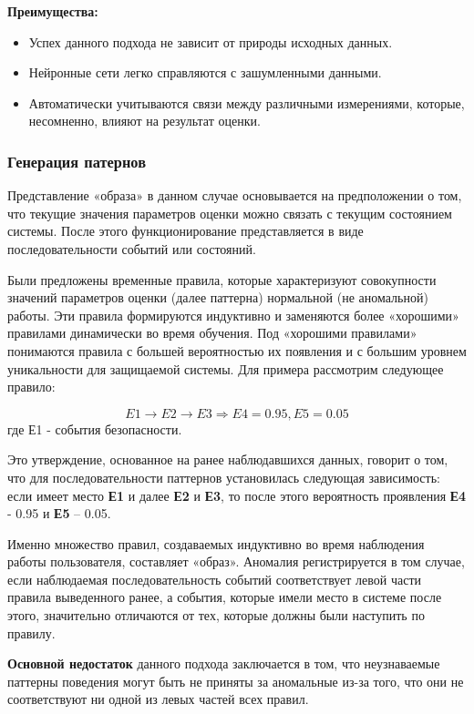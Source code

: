 \textbf{Преимущества:}
\begin{itemize}
    \item Успех данного подхода не зависит от природы исходных данных.
    \item Нейронные сети легко справляются с зашумленными данными.
    \item Автоматически учитываются связи между различными измерениями, которые, 
    несомненно, влияют на результат оценки.
\end{itemize}
\autocite{BeynonDavies}


\subsubsection{Генерация патернов}
Представление «образа» в данном случае основывается на предположении о том, что текущие значения 
параметров оценки можно связать с текущим состоянием системы. После этого функционирование 
представляется в виде последовательности событий или состояний.

Были предложены временные правила, которые характеризуют совокупности значений параметров оценки 
(далее паттерна) нормальной (не аномальной) работы. Эти правила формируются индуктивно и заменяются 
более «хорошими» правилами динамически во время обучения. Под «хорошими правилами» понимаются правила 
с большей вероятностью их появления и с большим уровнем уникальности для защищаемой системы. 
Для примера рассмотрим следующее правило:

\begin{equation}
	E1 \rightarrow E2\rightarrow E3 \Rightarrow E4 = 0.95, E5 = 0.05
\end{equation}
где Е1 - события безопасности.

Это утверждение, основанное на ранее наблюдавшихся данных, говорит о том, что для последовательности 
паттернов установилась следующая зависимость: если имеет место \textbf{Е1} и далее \textbf{Е2} и \textbf{Е3},
то после этого вероятность проявления \textbf{Е4} - 0.95 и \textbf{Е5} – 0.05.

Именно множество правил, создаваемых индуктивно во время наблюдения работы пользователя, составляет «образ». 
Аномалия регистрируется в том случае, если наблюдаемая последовательность событий соответствует левой 
части правила выведенного ранее, а события, которые имели место в системе после этого, 
значительно отличаются от тех, которые должны были наступить по правилу.

\textbf{Основной недостаток} данного подхода заключается в том, что неузнаваемые паттерны поведения могут 
быть не приняты за аномальные из-за того, что они не соответствуют ни одной из левых частей 
всех правил.\autocite{IDSystem}

